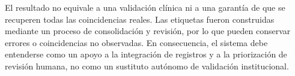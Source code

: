 El resultado no equivale a una validación clínica ni a una garantía de que se recuperen todas las coincidencias reales. Las etiquetas fueron construidas mediante un proceso de consolidación y revisión, por lo que pueden conservar errores o coincidencias no observadas. En consecuencia, el sistema debe entenderse como un apoyo a la integración de registros y a la priorización de revisión humana, no como un sustituto autónomo de validación institucional.
